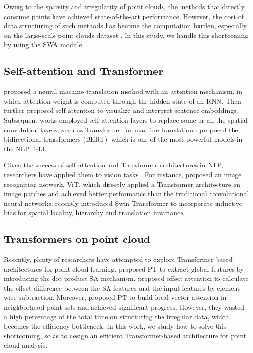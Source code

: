 \documentclass[10pt,twocolumn,letterpaper]{article}
\begin{document}
Owing to the sparsity and irregularity of point clouds, the methods that directly consume points have achieved state-of-the-art performance. However, the cost of data structuring of such methods has become the computation burden, especially on the large-scale point clouds dataset \cite{2019Point,xu2020grid}. In this study, we handle this shortcoming by using the SWA module.

\subsection{Self-attention and Transformer}
\cite{bahdanau2014neural} proposed a neural machine translation method with an attention mechanism, in which attention weight is computed through the hidden state of an RNN. Then \cite{lin2017structured} further proposed self-attention to visualize and interpret sentence embeddings. 
Subsequent works employed self-attention layers to replace some or all the spatial convolution layers, such as Transformer for machine translation \cite{2017Attention}. \cite{2018BERT} proposed the bidirectional transformers (BERT), which is one of the most powerful models in the NLP field. 

Given the success of self-attention and Transformer architectures in NLP, researchers have applied
them to vision tasks \cite{2019Local,DBLP:journals/corr/abs-1906-05909,2020Exploring}. For instance, \cite{DBLP:journals/corr/abs-2010-11929} proposed an image recognition network, ViT, which directly applied a Transformer architecture on image patches and achieved better performance than the traditional convolutional neural networks. \cite{liu2021swin} recently introduced Swin Transformer to incorporate inductive bias for spatial locality, hierarchy and translation invariance.

\subsection{Transformers on point cloud}
Recently, plenty of researchers have attempted to explore Transformer-based architectures for point cloud learning. \cite{Nico} proposed PT to extract global features by introducing the dot-product SA mechanism. \cite{guo2020pct} proposed offset-attention to calculate the offset difference between the SA features and the input features by element-wise subtraction. Moreover, \cite{2020Point} proposed PT to build local vector attention in neighborhood point sets and achieved significant progress. However, they wasted a high percentage of the total time on structuring the irregular data, which becomes the efficiency bottleneck. In this work, we study how to solve this shortcoming, so as to design an efficient Transformer-based architecture for point cloud analysis.
\end{document}
